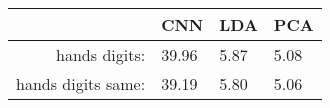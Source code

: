 \begin{tabular}{|r|l|l|l|}
  \hline
    & CNN & LDA & PCA \\
  \hline
  hands digits: & 39.96 & 5.87 & 5.08 \\
  \hline
  hands digits same: & 39.19 & 5.80 & 5.06 \\
  \hline
\end{tabular}
